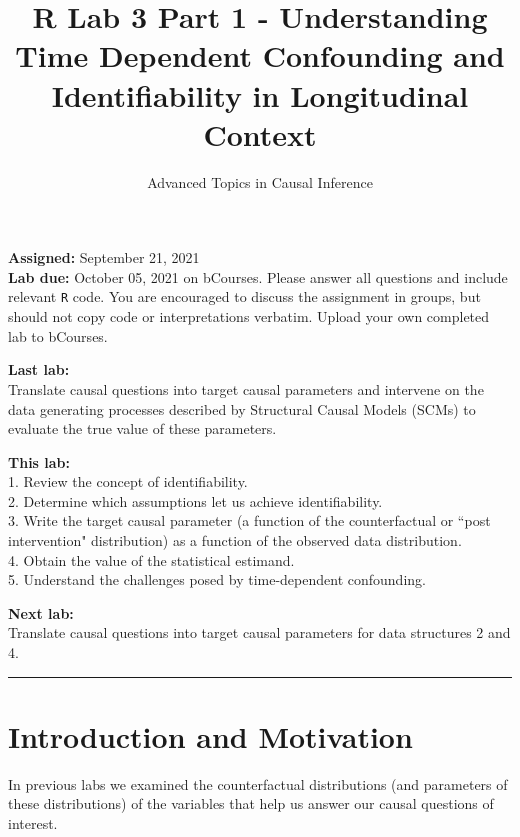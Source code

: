 \documentclass{exam}
\title{R Lab 3 Part 1 - Understanding Time Dependent Confounding and Identifiability in Longitudinal Context}
\author{Advanced Topics in Causal Inference}
\date{}
\begin{document}
\maketitle



\noindent \textbf{Assigned:} September 21, 2021\\
\textbf{Lab due:} October 05, 2021 on bCourses. Please answer all questions and include relevant \texttt{R} code. You are encouraged to discuss the assignment in groups, but should not copy code or interpretations verbatim. Upload your own completed lab to bCourses.



\noindent \textbf{Last lab:} \\
Translate causal questions into target causal parameters and intervene on the data generating processes described by Structural Causal Models (SCMs) to evaluate the true value of these parameters. 


\noindent \textbf{This lab:}\\
1. Review the concept of identifiability. \\
2. Determine which assumptions let us achieve identifiability. \\
3. Write the target causal parameter (a function of the counterfactual or ``post intervention" distribution) as a function of the observed data distribution. \\
4. Obtain the value of the statistical estimand. \\
5. Understand the challenges posed by time-dependent confounding.

\noindent \textbf{Next lab:}\\
Translate causal questions into target causal parameters for data structures 2 and 4. 


\begin{center}
\noindent\rule{18cm}{0.4pt}
\end{center}

\section{Introduction and Motivation}

In previous labs we examined the counterfactual distributions (and parameters of these distributions) of the variables that help us answer our causal questions of interest. 
\end{document}

